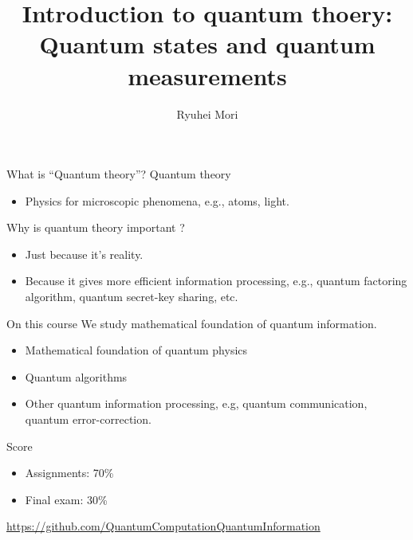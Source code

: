 \documentclass{beamer}
\title{Introduction to quantum thoery: Quantum states and quantum measurements}
\author{Ryuhei Mori}
\institute{Tokyo Institute of Technology}
\begin{document}
\begin{frame}[plain]
\maketitle
\end{frame}


\begin{frame}{What is ``Quantum theory''?}
Quantum theory

\vspace{1em}
\begin{itemize}
\item Physics for microscopic phenomena, e.g., atoms, light.
\end{itemize}

\vspace{2em}
Why is quantum theory important ?

\vspace{1em}
\begin{itemize}
\setlength{\itemsep}{2em}
\item Just because it's reality.
\item Because it gives more efficient information processing, e.g., quantum factoring algorithm, quantum secret-key sharing, etc.
\end{itemize}
\end{frame}

\begin{frame}{On this course}
We study mathematical foundation of quantum information.
\begin{itemize}
\setlength{\itemsep}{1em}
\item Mathematical foundation of quantum physics
\item Quantum algorithms
\item Other quantum information processing, e.g, quantum communication, quantum error-correction.
\end{itemize}

\vspace{2em}
Score
\begin{itemize}
\item Assignments: 70\%
\item Final exam: 30\%
\end{itemize}

\vfill
\small
\url{https://github.com/QuantumComputationQuantumInformation}
\end{frame}
\end{document}
